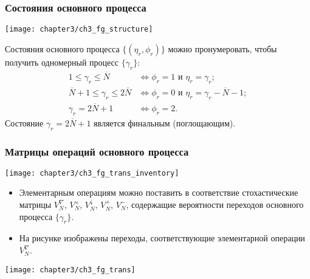 \begin{frame}
    \frametitle{Состояния основного процесса}
    \begin{center}
        \texttt{[image: chapter3/ch3\_fg\_structure]}
    \end{center}

    \footnotesize
    Состояния основного процесса $\{(\eta_r, \phi_r)\}$ можно пронумеровать, чтобы получить одномерный процесс $\{ \gamma_r \}$:
    $$
        \begin{aligned}
            1 \leqslant \gamma_r \leqslant \overline{N}                 &\Leftrightarrow \phi_r = 1 \text{ и } \eta_r = \gamma_r; \\
            \overline{N} + 1 \leqslant \gamma_r \leqslant 2\overline{N} &\Leftrightarrow \phi_r = 0 \text{ и } \eta_r = \gamma_r - \overline{N} - 1;\\
            \gamma_r = 2\overline{N}+1                                  &\Leftrightarrow \phi_r = 2.
        \end{aligned}
    $$
    Состояние $\gamma_r = 2\overline{N} + 1$ является финальным (поглощающим).
\end{frame}

\begin{frame}[allowframebreaks]
    \frametitle{Матрицы операций основного процесса}
    \begin{center}
        \texttt{[image: chapter3/ch3\_fg\_trans\_inventory]}
    \end{center}
    \footnotesize
    \begin{itemize}
        \item Элементарным операциям можно поставить в соответствие стохастические матрицы $V^\nabla_N$, $V^\times_N$, $V^\downarrow_N$, $V^+_N$, $V^-_N$, содержащие вероятности переходов основного процесса $\{ \gamma_r \}$.
        \item На рисунке изображены переходы, соответствующие элементарной операции $V^\nabla_N$.
    \end{itemize}
    \vfill
    \framebreak
    \begin{center}
        \texttt{[image: chapter3/ch3\_fg\_trans]}
    \end{center}
\end{frame}

